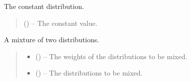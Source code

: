 \documentclass[letterpaper,10pt,english]{sphinxmanual}
\begin{document}
\begin{fulllineitems}
\label{\detokenize{tyche:tyche.Distributions.constant}}
\pysigstartsignatures
{}
\pysigstopsignatures
\sphinxAtStartPar
The constant distribution.
\begin{quote}\begin{description}
\sphinxAtStartPar
{} () – The constant value.

\end{description}\end{quote}

\end{fulllineitems}


\begin{fulllineitems}
\label{\detokenize{tyche:tyche.Distributions.mixture}}
\pysigstartsignatures
{}
\pysigstopsignatures
\sphinxAtStartPar
A mixture of two distributions.
\begin{quote}\begin{description}
\begin{itemize}
\item {} 
\sphinxAtStartPar
{} () – The weights of the distributions to be mixed.

\item {} 
\sphinxAtStartPar
{} () – The distributions to be mixed.

\end{itemize}

\end{description}\end{quote}

\end{fulllineitems}

\end{document}
